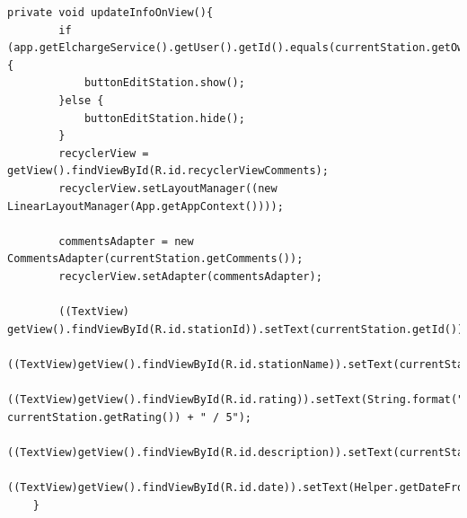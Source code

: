 \begin{lstlisting}[label=list:updateInfoOnView,caption=Odnowienie informacji o stacji na ekranie,basicstyle=\tiny\ttfamily]
    private void updateInfoOnView(){
        if (app.getElchargeService().getUser().getId().equals(currentStation.getOwnerID())){
            buttonEditStation.show();
        }else {
            buttonEditStation.hide();
        }
        recyclerView = getView().findViewById(R.id.recyclerViewComments);
        recyclerView.setLayoutManager((new LinearLayoutManager(App.getAppContext())));

        commentsAdapter = new CommentsAdapter(currentStation.getComments());
        recyclerView.setAdapter(commentsAdapter);

        ((TextView) getView().findViewById(R.id.stationId)).setText(currentStation.getId());
        ((TextView)getView().findViewById(R.id.stationName)).setText(currentStation.getStationName());
        ((TextView)getView().findViewById(R.id.rating)).setText(String.format("%.2f", currentStation.getRating()) + " / 5");
        ((TextView)getView().findViewById(R.id.description)).setText(currentStation.getDescription());
        ((TextView)getView().findViewById(R.id.date)).setText(Helper.getDateFromISO8601(currentStation.getUpdateAt()));
    }
\end{lstlisting}

